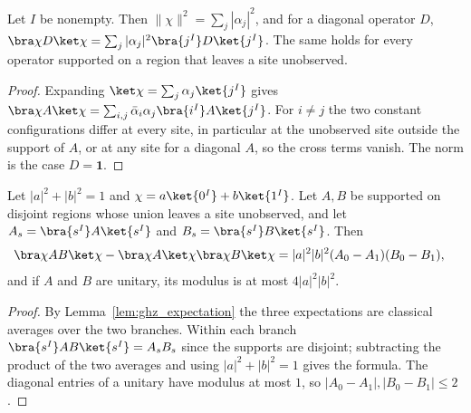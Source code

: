 \begin{lemma}
    \label{lem:ghz_expectation}
    \leanok
    Let $I$ be nonempty. Then $\|\chi\|^2=\sum_j|\alpha_j|^2$, and for a diagonal
    operator $D$, $\bra\chi D\ket\chi=\sum_j|\alpha_j|^2\bra{j^I}D\ket{j^I}$. The same holds
    for every operator supported on a region that leaves a site unobserved.
\end{lemma}
\begin{proof}
    \leanok
    Expanding $\ket\chi=\sum_j\alpha_j\ket{j^I}$ gives
    $\bra\chi A\ket\chi=\sum_{i,j}\bar\alpha_i\alpha_j\bra{i^I}A\ket{j^I}$. For $i\neq j$ the
    two constant configurations differ at every site, in particular at the unobserved site
    outside the support of $A$, or at any site for a diagonal $A$, so the cross terms vanish.
    The norm is the case $D=\mathbf 1$.
\end{proof}

\begin{lemma}
    \label{lem:ghz_weighted_covariance}
    \leanok
    Let $|a|^2+|b|^2=1$ and $\chi=a\ket{0^I}+b\ket{1^I}$. Let $A,B$ be supported on disjoint
    regions whose union leaves a site unobserved, and let $A_s=\bra{s^I}A\ket{s^I}$ and
    $B_s=\bra{s^I}B\ket{s^I}$. Then
    \begin{align}
        \bra\chi AB\ket\chi-\bra\chi A\ket\chi\bra\chi B\ket\chi
         & =|a|^2|b|^2(A_0-A_1)(B_0-B_1),\notag
    \end{align}
    and if $A$ and $B$ are unitary, its modulus is at most $4|a|^2|b|^2$.
\end{lemma}
\begin{proof}
    \leanok
    By Lemma~\ref{lem:ghz_expectation} the three expectations are classical averages over the
    two branches. Within each branch $\bra{s^I}AB\ket{s^I}=A_sB_s$ since the supports are
    disjoint; subtracting the product of the two averages and using $|a|^2+|b|^2=1$ gives the
    formula. The diagonal entries of a unitary have modulus at most $1$, so
    $|A_0-A_1|,|B_0-B_1|\leq2$.
\end{proof}

